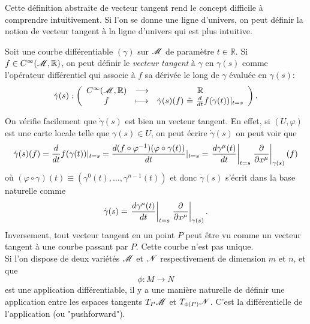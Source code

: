 \documentclass[a4paper,11pt]{report}
\begin{document}
                Cette définition abstraite de vecteur tangent rend le concept difficile à comprendre intuitivement. Si l'on se donne une ligne d'univers, on peut définir la notion de vecteur tangent à la ligne d'univers qui est plus intuitive.
                \begin{defn}
                    Soit une courbe différentiable $(\gamma)$ sur $\mathscr{M}$ de paramètre $t\in\mathbb{R}$. Si $f\in C^\infty(\mathscr{M},\mathbb{R})$, on peut définir le \textit{vecteur tangent} à $\gamma$ en $\gamma(s)$ comme l'opérateur différentiel qui associe à $f$ sa dérivée le long de $\gamma$ évaluée en $\gamma(s)$:
                    \begin{equation}
                    \dot{\gamma}(s):\left(
                    \begin{array}{ccc}
                        C^\infty(\mathscr{M},\mathbb{R}) & \longrightarrow & \mathbb{R} \\
                        f & \longmapsto &\dot{\gamma}(s)(f) ~\hat{=}~ \frac{d}{dt}f(\gamma(t))|_{t=s}
                    \end{array}
                    \right).
                    \end{equation}
                \end{defn}
                
                On vérifie facilement que $\dot{\gamma}(s)$ est bien un vecteur tangent. En effet, si $(U,\varphi)$ est une carte locale telle que $\gamma(s)\in U$, on peut écrire $\dot{\gamma}(s)$ on peut voir que
                \begin{equation}
                    \dot{\gamma}(s)(f) = \frac{d}{dt}f(\gamma(t))|_{t=s}= \frac{d(f\circ\varphi^{-1})(\varphi\circ\gamma(t))}{dt}|_{t=s}= \eval{\frac{d\gamma^\mu(t)}{dt}}_{t=s}\eval{\pdv{}{x^\mu}}_{\gamma(s)}(f)
                \end{equation}
                où $(\varphi\circ\gamma)(t)\equiv(\gamma^0(t),\dots,\gamma^{n-1}(t))$ et donc $\dot{\gamma}(s)$ s'écrit dans la base naturelle comme
                \begin{equation}
                     \dot{\gamma}(s) =  \eval{\frac{d\gamma^\mu(t)}{dt}}_{t=s}\eval{\pdv{}{x^\mu}}_{\gamma(s)}.
                \end{equation}
                Inversement, tout vecteur tangent en un point $P$ peut être vu comme un vecteur tangent à une courbe passant par $P$. Cette courbe n'est pas unique.\\
                
                Si l'on dispose de deux variétés $\mathscr{M}$ et $\mathscr{N}$ respectivement de dimension $m$ et $n$, et que 
                \begin{equation*}
                    \phi : M\to N
                \end{equation*}
                est une application différentiable, il y a une manière naturelle de définir une application entre les espaces tangents $T_P\mathscr{M}$ et $T_{\phi(P)}\mathscr{N}$. C'est la différentielle de l'application (ou "pushforward").
                
\end{document}
